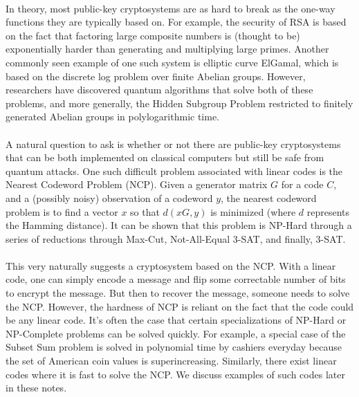 \documentclass{article}
\theoremstyle{definition}
\begin{document}
\paragraph{}
In theory, most public-key cryptosystems are as hard to break as the one-way functions they are typically based on. For example, the security of RSA is based on the fact that factoring large composite numbers is (thought to be) exponentially harder than generating and multiplying large primes. Another commonly seen example of one such system is elliptic curve ElGamal, which is based on the discrete log problem over finite Abelian groups. However, researchers have discovered quantum algorithms that solve both of these problems, and more generally, the Hidden Subgroup Problem restricted to finitely generated Abelian groups in polylogarithmic time.

\paragraph{}
A natural question to ask is whether or not there are public-key cryptosystems that can be both implemented on classical computers but still be safe from quantum attacks. One such difficult problem associated with linear codes is the Nearest Codeword Problem (NCP). Given a generator matrix $G$ for a code $C$, and a (possibly noisy) observation of a codeword $y$, the nearest codeword problem is to find a vector $x$ so that $d(xG, y)$ is minimized (where $d$ represents the Hamming distance). It can be shown that this problem is NP-Hard through a series of reductions through Max-Cut, Not-All-Equal 3-SAT, and finally, 3-SAT.

\paragraph{}
This very naturally suggests a cryptosystem based on the NCP. With a linear code, one can simply encode a message and flip some correctable number of bits to encrypt the message. But then to recover the message, someone needs to solve the NCP. However, the hardness of NCP is reliant on the fact that the code could be any linear code. It's often the case that certain specializations of NP-Hard or NP-Complete problems can be solved quickly. For example, a special case of the Subset Sum problem is solved in polynomial time by cashiers everyday because the set of American coin values is superincreasing. Similarly, there exist linear codes where it is fast to solve the NCP. We discuss examples of such codes later in these notes. 
\end{document}
